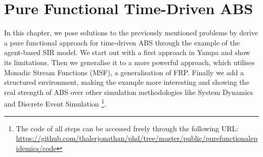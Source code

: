 \chapter{Pure Functional Time-Driven ABS}
\label{ch:timedriven}

In this chapter, we pose solutions to the previously mentioned problems by derive a pure functional approach for time-driven ABS through the example of the agent-based SIR model. We start out with a first approach in Yampa and show its limitations. Then we generalise it to a more powerful approach, which utilises Monadic Stream Functions (MSF), a generalisation of FRP. Finally we add a structured environment, making the example more interesting and showing the real strength of ABS over other simulation methodologies like System Dynamics and Discrete Event Simulation \footnote{The code of all steps can be accessed freely through the following URL: \url{https://github.com/thalerjonathan/phd/tree/master/public/purefunctionalepidemics/code}}.







